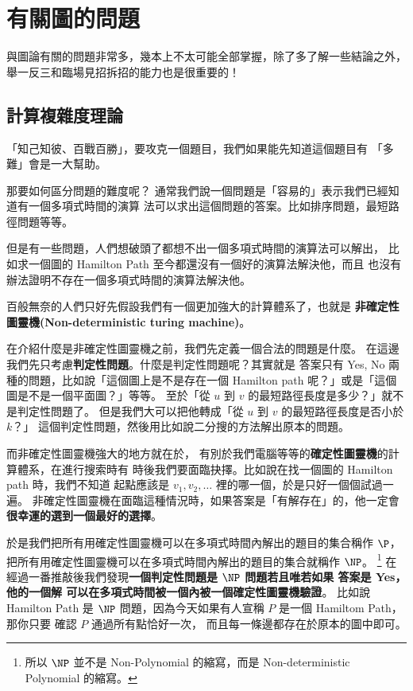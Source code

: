 \documentclass[a4paper,12pt]{book}
\begin{document}
\section{有關圖的問題}
與圖論有關的問題非常多，幾本上不太可能全部掌握，除了多了解一些結論之外，
舉一反三和臨場見招拆招的能力也是很重要的！

\subsection{計算複雜度理論}
「知己知彼、百戰百勝」，要攻克一個題目，我們如果能先知道這個題目有
「多難」會是一大幫助。

那要如何區分問題的難度呢？
通常我們說一個問題是「容易的」表示我們已經知道有一個多項式時間的演算
法可以求出這個問題的答案。比如排序問題，最短路徑問題等等。

但是有一些問題，人們想破頭了都想不出一個多項式時間的演算法可以解出，
比如求一個圖的 Hamilton Path 至今都還沒有一個好的演算法解決他，而且
也沒有辦法證明不存在一個多項式時間的演算法解決他。

百般無奈的人們只好先假設我們有一個更加強大的計算體系了，也就是
{\bf 非確定性圖靈機(Non-deterministic turing machine)}。

在介紹什麼是非確定性圖靈機之前，我們先定義一個合法的問題是什麼。
在這邊我們先只考慮{\bf 判定性問題}。什麼是判定性問題呢？其實就是
答案只有 Yes, No 兩種的問題，比如說「這個圖上是不是存在一個 
Hamilton path 呢？」或是「這個圖是不是一個平面圖？」等等。
至於「從 $u$ 到 $v$ 的最短路徑長度是多少？」就不是判定性問題了。
但是我們大可以把他轉成「從 $u$ 到 $v$ 的最短路徑長度是否小於 $k$？」
這個判定性問題，然後用比如說二分搜的方法解出原本的問題。

而非確定性圖靈機強大的地方就在於，
有別於我們電腦等等的{\bf 確定性圖靈機}的計算體系，在進行搜索時有
時後我們要面臨抉擇。比如說在找一個圖的 Hamilton path 時，我們不知道
起點應該是 $v_1, v_2, \dots$ 裡的哪一個，於是只好一個個試過一遍。
非確定性圖靈機在面臨這種情況時，如果答案是「有解存在」的，他一定會
{\bf 很幸運的選到一個最好的選擇}。

於是我們把所有用確定性圖靈機可以在多項式時間內解出的題目的集合稱作
$\P$，把所有用確定性圖靈機可以在多項式時間內解出的題目的集合就稱作
$\NP$。%
\footnote{所以 $\NP$ 並不是 Non-Polynomial 的縮寫，而是
  Non-deterministic Polynomial 的縮寫。}
在經過一番推敲後我們發現{\bf 一個判定性問題是 $\NP$ 問題若且唯若如果
答案是 Yes，他的一個解 可以在多項式時間被一個內被一個確定性圖靈機驗證}。
比如說 Hamilton Path 是 $\NP$ 問題，因為今天如果有人宣稱 $P$ 是一個 
Hamiltom Path，那你只要 確認 $P$ 通過所有點恰好一次，
而且每一條邊都存在於原本的圖中即可。
\end{document}
